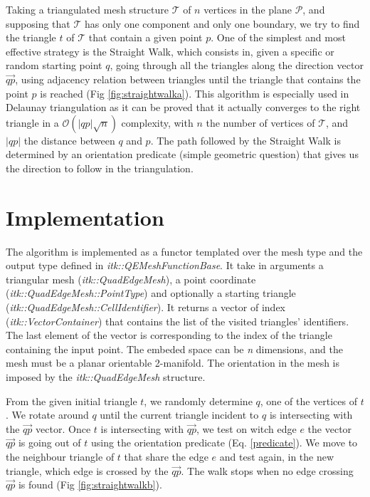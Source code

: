 \documentclass{InsightArticle}
\begin{document}
Taking a triangulated mesh structure $\mathcal{T}$ of $\mathit{n}$ vertices in the plane $\mathcal{P}$, and supposing that $\mathcal{T}$ has only one component and only one boundary,  we try to find the triangle $\mathit{t}$ of $\mathcal{T}$ that contain a given point $\mathit{p}$. One of the simplest and most effective strategy is the Straight Walk, which consists in, given a specific or random starting point $\mathit{q}$, going through all the triangles along the direction vector $\overrightarrow{\mathit{qp}}$, using adjacency relation between triangles until the triangle that contains the point $\mathit{p}$ is reached (Fig \ref{fig:straightwalka}).
This algorithm is especially used in Delaunay triangulation as it can be proved that it actually converges to the right triangle in a $\mathcal{O}(\lvert \mathit{qp}\rvert \sqrt{\mathit{n}})$ complexity, with $\mathit{n}$ the number of vertices of $\mathcal{T}$, and $\lvert\mathit{qp}\rvert$ the distance between $\mathit{q}$ and $\mathit{p}$.
The path followed by the Straight Walk is determined by an orientation predicate (simple geometric question) that gives us the direction to follow in the triangulation.

\section{Implementation}

The algorithm is implemented as a functor templated over the mesh type and the output type defined in \emph{itk::QEMeshFunctionBase}. It take in arguments a triangular mesh (\emph{itk::QuadEdgeMesh}), a point coordinate (\emph{itk::QuadEdgeMesh::PointType}) and optionally a starting triangle (\emph{itk::QuadEdgeMesh::CellIdentifier}). It returns a vector of index (\emph{itk::VectorContainer}) that contains the list of the visited triangles' identifiers. The last element of the vector is corresponding to the index of the triangle containing the input point. The embeded space can be \emph{n} dimensions, and the mesh must be a planar orientable 2-manifold. The orientation in the mesh is imposed by the \emph{itk::QuadEdgeMesh} structure.

From the given initial triangle $\mathit{t}$, we randomly determine $\mathit{q}$, one of the vertices of $\mathit{t}$. We rotate around $\mathit{q}$ until the current triangle incident to $\mathit{q}$ is intersecting with the $\overrightarrow{\mathit{qp}}$ vector. Once $\mathit{t}$ is intersecting with $\overrightarrow{\mathit{qp}}$, we test on witch edge $\mathit{e}$ the vector $\overrightarrow{\mathit{qp}}$ is going out of $\mathit{t}$ using the orientation predicate (Eq. \ref{predicate}). We move to the neighbour triangle of $\mathit{t}$ that share the edge $\mathit{e}$ and test again, in the new triangle, which edge is crossed by the $\overrightarrow{\mathit{qp}}$. The walk stops when no edge crossing $\overrightarrow{\mathit{qp}}$ is found (Fig \ref{fig:straightwalkb}).
\end{document}
